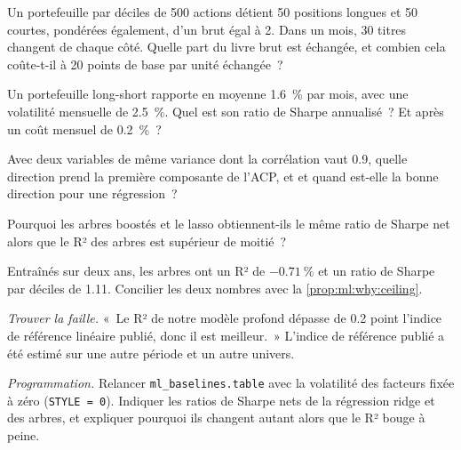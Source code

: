 \begin{exercise}[$\star$]\label{exo:ml:linear-and-regularised-baselines:1}
Un portefeuille par déciles de 500 actions détient 50 positions longues et 50 courtes, pondérées également, d'un brut égal à 2. Dans un mois, 30 titres changent
de chaque côté. Quelle part du livre brut est échangée, et combien cela coûte-t-il à 20 points de base par unité échangée~?
\end{exercise}

\begin{exercise}[$\star$]\label{exo:ml:linear-and-regularised-baselines:2}
Un portefeuille long-short rapporte en moyenne 1.6~\% par mois, avec une volatilité mensuelle de 2.5~\%. Quel est son
ratio de Sharpe annualisé~? Et après un coût mensuel de 0.2~\%~?
\end{exercise}

\begin{exercise}[$\star$]\label{exo:ml:linear-and-regularised-baselines:3}
Avec deux variables de même variance dont la corrélation vaut 0.9, quelle direction prend la première composante de l'ACP, et
et quand est-elle la bonne direction pour une régression~?
\end{exercise}

\begin{exercise}[$\star\star$]\label{exo:ml:linear-and-regularised-baselines:4}
Pourquoi les arbres boostés et le lasso obtiennent-ils le même ratio de Sharpe net alors que le R² des arbres est
supérieur de moitié~?
\end{exercise}

\begin{exercise}[$\star\star$]\label{exo:ml:linear-and-regularised-baselines:5}
Entraînés sur deux ans, les arbres ont un R² de $-0.71~\%$ et un ratio de Sharpe par déciles de 1.11. Concilier les deux nombres
avec la \cref{prop:ml:why:ceiling}.
\end{exercise}

\begin{exercise}[$\star\star$]\label{exo:ml:linear-and-regularised-baselines:6}
\emph{Trouver la faille.} «~Le R² de notre modèle profond dépasse de 0.2 point l'indice de référence linéaire publié, donc il est meilleur.~»
L'indice de référence publié a été estimé sur une autre période et un autre univers.
\end{exercise}

\begin{exercise}[$\star\star\star$]\label{exo:ml:linear-and-regularised-baselines:7}
\emph{Programmation.} Relancer \texttt{ml\_baselines.table} avec la volatilité des facteurs fixée à zéro (\texttt{STYLE = 0}). Indiquer
les ratios de Sharpe nets de la régression ridge et des arbres, et expliquer pourquoi ils changent autant alors que le R² bouge à peine.
\end{exercise}

